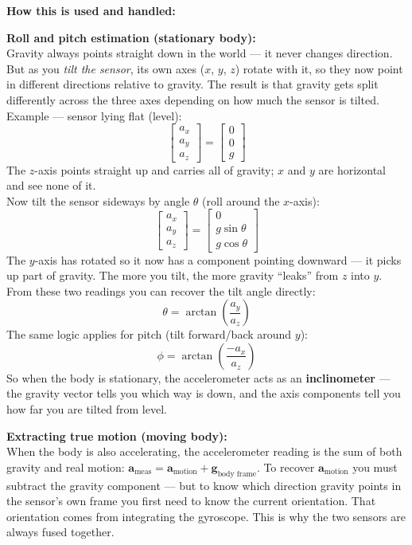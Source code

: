 \documentclass[12pt, a4paper]{article}
\begin{document}
\begin{notebox}
  \textbf{How this is used and handled:}

  \medskip
  \textbf{Roll and pitch estimation (stationary body):}\\
  Gravity always points straight down in the world --- it never
  changes direction.
  But as you \emph{tilt the sensor}, its own axes ($x$, $y$, $z$)
  rotate with it, so they now point in different directions relative
  to gravity.
  The result is that gravity gets split differently across the three
  axes depending on how much the sensor is tilted.\\[4pt]
  Example --- sensor lying flat (level):
  \[
    \begin{bmatrix} a_x \\ a_y \\ a_z \end{bmatrix}
    = \begin{bmatrix} 0 \\ 0 \\ g \end{bmatrix}
  \]
  The $z$-axis points straight up and carries all of gravity; $x$ and
  $y$ are horizontal and see none of it.\\[4pt]
  Now tilt the sensor sideways by angle $\theta$ (roll around the
  $x$-axis):
  \[
    \begin{bmatrix} a_x \\ a_y \\ a_z \end{bmatrix}
    = \begin{bmatrix} 0 \\ g\sin\theta \\ g\cos\theta \end{bmatrix}
  \]
  The $y$-axis has rotated so it now has a component pointing
  downward --- it picks up part of gravity.
  The more you tilt, the more gravity ``leaks'' from $z$ into $y$.
  From these two readings you can recover the tilt angle directly:
  \[
    \theta = \arctan\!\left(\frac{a_y}{a_z}\right)
  \]
  The same logic applies for pitch (tilt forward/back around $y$):
  \[
    \phi = \arctan\!\left(\frac{-a_x}{a_z}\right)
  \]
  So when the body is stationary, the accelerometer acts as an
  \textbf{inclinometer} --- the gravity vector tells you which
  way is down, and the axis components tell you how far you are
  tilted from level.

  \medskip
  \textbf{Extracting true motion (moving body):}\\
  When the body is also accelerating, the accelerometer reading
  is the sum of both gravity and real motion:
  $\mathbf{a}_{\text{meas}} = \mathbf{a}_{\text{motion}} + \mathbf{g}_{\text{body frame}}$.
  To recover $\mathbf{a}_{\text{motion}}$ you must subtract the
  gravity component --- but to know which direction gravity points
  in the sensor's own frame you first need to know the current
  orientation.
  That orientation comes from integrating the gyroscope.
  This is why the two sensors are always fused together.
\end{notebox}
\end{document}
